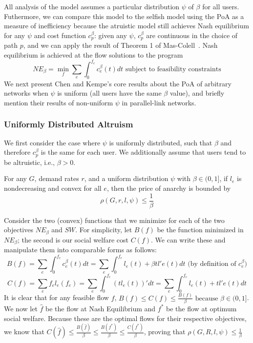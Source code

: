 All analysis of the model assumes a particular distribution $\psi$ of $\beta$ for all users. 
Futhermore, we can compare this model to the selfish model using the PoA as a measure of inefficiency
because the atruistic model still achieves Nash equilibrium for any $\psi$ and cost function $c^\beta_p$: given any $\psi$, $c^\beta_p$ are continuous in the choice of path $p$, and we can apply the result of Theorem 1 of Mas-Colell~\cite{mascolell}. Nash equilibrium is achieved at the flow solutions to the program
$$NE_\beta = \min_f\sum_e\int_0^{f_e}c_e^\beta(t)dt \text{ subject to feasibility constraints}$$
We next present Chen and Kempe's core results about the PoA of arbitrary networks when $\psi$ is uniform (all users have the same $\beta$ value), and briefly mention their results of non-uniform $\psi$ in parallel-link networks.

\subsubsection{Uniformly Distributed Altruism}
We first consider the case where $\psi$ is uniformly distributed, such that $\beta$ and therefore $c^\beta_p$ is the same for each user. We additionally assume that users tend to be altruistic, i.e., $\beta > 0$.
\begin{theorem}
For any $G$, demand rates $r$, and 
a uniform distribution $\psi$ with $\beta \in (0, 1]$,
if $l_e$ is nondecreasing and convex for all $e$, then the price of anarchy is bounded by 
    $$\rho(G,r,l,\psi) \le \frac{1}{\beta}$$
\end{theorem}

\begin{proof-sketch}
    Consider the two (convex) functions that we minimize for each of the two objectives $NE_\beta$ and $SW$. For simplicity, let $B(f)$ be the function minimized in $NE_\beta$; the second is our social welfare cost $C(f)$.
    We can write these and manipulate them into comparable forms as follows:
    $$B(f) = \sum_e\int_0^{{f}_e}c_e^\beta(t)dt = 
        \sum_e\int_0^{{f}_e} l_e(t) + \beta tl'e(t)dt\text{ (by definition of $c^\beta_e$)}$$
    $$C(f) = \sum_ef_el_e(f_e) = \sum_e\int_0^{f_e} (tl_e(t))' dt 
        = \sum_e\int_0^{f_e} l_e(t) + tl'e(t)dt$$ 
    It is clear that for any feasible flow $f$, 
    $B(f) \le C(f) \le \frac{B(f)}{\beta} \text{ because $\beta\in(0,1]$}$.
    We now let $\hat{f}$ be the flow at Nash Equilibrium and $f^*$ be the flow at optimum social welfare. Because these are the optimal flows for their respective objectives, we know that 
    $C(\hat{f}) \le \frac{B(\hat{f})}{\beta} \le \frac{B(f^*)}{\beta} \le \frac{C(f^*)}{\beta}$,
    proving that 
    $\rho(G,R,l,\psi) \le \frac{1}{\beta}$
\end{proof-sketch}

